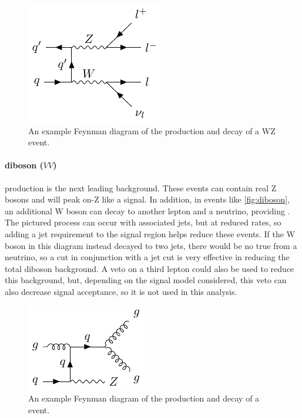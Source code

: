 \begin{centering}
\begin{figure}[bth]
\myfloatalign
\includegraphics[width=.70\linewidth]{feynman/diboson.pdf}
\caption{An example Feynman diagram of the production and decay of a WZ event.}
\label{fig:diboson}
\end{figure}
\end{centering}

\paragraph{diboson ($VV$)} production is the next leading background. These events can contain real Z bosons and will peak on-Z like a signal. In addition, in events like \autoref{fig:diboson}, an additional W boson can decay to another lepton and a neutrino, providing \MET. The pictured process can occur with associated jets, but at reduced rates, so adding a jet requirement to the signal region helps reduce these events. If the W boson in this diagram instead decayed to two jets, there would be no true \MET from a neutrino, so a \MET cut in conjunction with a jet cut is very effective in reducing the total diboson background. A veto on a third lepton could also be used to reduce this background, but, depending on the signal model considered, this veto can also decrease signal acceptance, so it is not used in this analysis.

\begin{centering}
\begin{figure}[bth]
\myfloatalign
\includegraphics[width=.70\linewidth]{feynman/zjets.pdf}
\caption{An example Feynman diagram of the production and decay of a \dyjets event.}
\label{fig:zjets}
\end{figure}
\end{centering}

